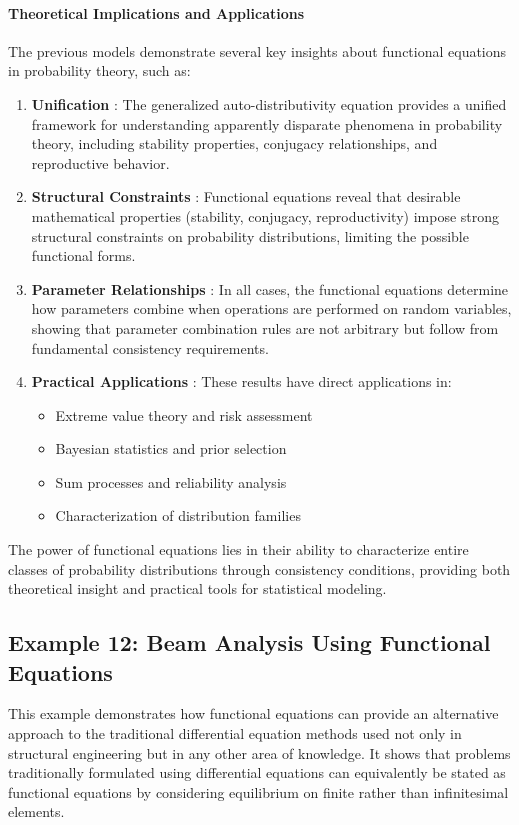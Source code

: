 \paragraph{Theoretical Implications and Applications}
The previous models demonstrate several key insights about functional equations in probability theory, such as:
\begin{enumerate}
    \item {\bf Unification }: The generalized auto-distributivity equation provides a unified framework for understanding apparently disparate phenomena in probability theory, including stability properties, conjugacy relationships, and reproductive behavior.

\item {\bf Structural Constraints }: Functional equations reveal that desirable mathematical properties (stability, conjugacy, reproductivity) impose strong structural constraints on probability distributions, limiting the possible functional forms.

\item {\bf Parameter Relationships }: In all cases, the functional equations determine how parameters combine when operations are performed on random variables, showing that parameter combination rules are not arbitrary but follow from fundamental consistency requirements.

\item {\bf Practical Applications }: These results have direct applications in:
\begin{itemize}
    \item Extreme value theory and risk assessment
    \item Bayesian statistics and prior selection
    \item Sum processes and reliability analysis
    \item Characterization of distribution families
\end{itemize}
\end{enumerate}

The power of functional equations lies in their ability to characterize entire classes of probability distributions through consistency conditions, providing both theoretical insight and practical tools for statistical modeling.

\subsection{Example 12: Beam Analysis Using Functional Equations}
This example demonstrates how functional equations can provide an alternative approach to the traditional differential equation methods used not only in structural engineering but in any other area of knowledge. It shows that problems traditionally formulated using differential equations can equivalently be stated as functional equations by considering equilibrium on finite rather than infinitesimal elements.

